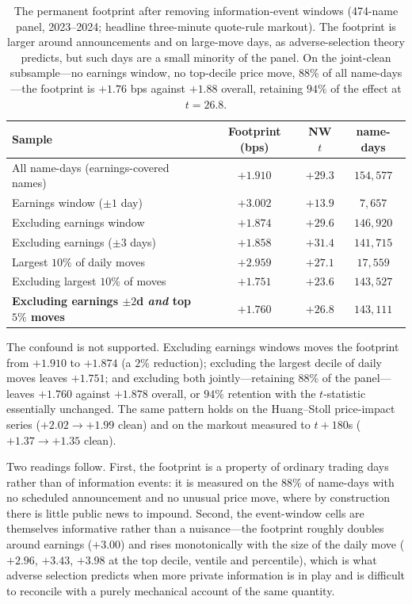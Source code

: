 \documentclass[11pt]{article}
\begin{document}
\begin{table}[htbp]
\centering
\begin{tabular}{lccc}
\toprule
\textbf{Sample} & \textbf{Footprint (bps)} & \textbf{NW $t$} & \textbf{name-days} \\
\midrule
All name-days (earnings-covered names) & $+1.910$ & $+29.3$ & $154{,}577$ \\
\midrule
\quad Earnings window ($\pm1$ day) & $+3.002$ & $+13.9$ & $7{,}657$ \\
\quad Excluding earnings window & $+1.874$ & $+29.6$ & $146{,}920$ \\
\quad Excluding earnings ($\pm3$ days) & $+1.858$ & $+31.4$ & $141{,}715$ \\
\midrule
\quad Largest $10\%$ of daily moves & $+2.959$ & $+27.1$ & $17{,}559$ \\
\quad Excluding largest $10\%$ of moves & $+1.751$ & $+23.6$ & $143{,}527$ \\
\midrule
\textbf{Excluding earnings $\pm2$d \emph{and} top $5\%$ moves} & $\mathbf{+1.760}$ & $\mathbf{+26.8}$ & $143{,}111$ \\
\bottomrule
\end{tabular}
\caption{The permanent footprint after removing information-event windows (474-name panel,
2023--2024; headline three-minute quote-rule markout). The footprint is larger around
announcements and on large-move days, as adverse-selection theory predicts, but such days
are a small minority of the panel. On the joint-clean subsample---no earnings window, no
top-decile price move, $88\%$ of all name-days---the footprint is $+1.76$ bps against
$+1.88$ overall, retaining $94\%$ of the effect at $t=26.8$.}
\label{tab:news}
\end{table}

The confound is not supported. Excluding earnings windows moves the footprint from $+1.910$
to $+1.874$ (a $2\%$ reduction); excluding the largest decile of daily moves leaves
$+1.751$; and excluding both jointly---retaining $88\%$ of the panel---leaves $+1.760$
against $+1.878$ overall, or $94\%$ retention with the $t$-statistic essentially unchanged.
The same pattern holds on the Huang--Stoll price-impact series ($+2.02 \to +1.99$ clean)
and on the markout measured to $t+180$s ($+1.37 \to +1.35$ clean).

Two readings follow. First, the footprint is a property of ordinary trading days rather
than of information events: it is measured on the $88\%$ of name-days with no scheduled
announcement and no unusual price move, where by construction there is little public news
to impound. Second, the event-window cells are themselves informative rather than a
nuisance---the footprint roughly doubles around earnings ($+3.00$) and rises monotonically
with the size of the daily move ($+2.96$, $+3.43$, $+3.98$ at the top decile, ventile and
percentile), which is what adverse selection predicts when more private information is in
play and is difficult to reconcile with a purely mechanical account of the same quantity.
\end{document}
